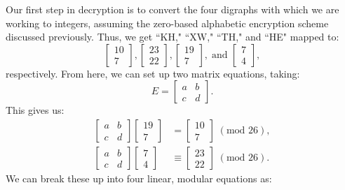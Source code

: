 \documentclass{article}
\begin{document}
\noindent Our first step in decryption is to convert the four digraphs with which we are working to integers, assuming the zero-based alphabetic encryption scheme discussed previously. Thus, we get ``KH," ``XW," ``TH," and ``HE" mapped to:
\[
    \begin{bmatrix}
        10 \\
        7
    \end{bmatrix},
    \begin{bmatrix}
        23 \\
        22
    \end{bmatrix},
    \begin{bmatrix}
        19 \\
        7
    \end{bmatrix}, \; \text{and }
    \begin{bmatrix}
        7 \\
        4
    \end{bmatrix},
\]
respectively. From here, we can set up two matrix equations, taking:
\[
    E = \begin{bmatrix}
        a & b \\
        c & d
    \end{bmatrix}.
\]
This gives us:
\begin{align*}
    \begin{bmatrix}
        a & b \\
        c & d
    \end{bmatrix} \begin{bmatrix}
        19 \\
        7
    \end{bmatrix} &= \begin{bmatrix}
        10 \\
        7
    \end{bmatrix} \; (\text{mod } 26), \\
    \begin{bmatrix}
        a & b \\
        c & d
    \end{bmatrix} \begin{bmatrix}
        7 \\
        4
    \end{bmatrix} &\equiv \begin{bmatrix}
        23 \\
        22
    \end{bmatrix} \; (\text{mod } 26).
\end{align*}
We can break these up into four linear, modular equations as:
\end{document}
